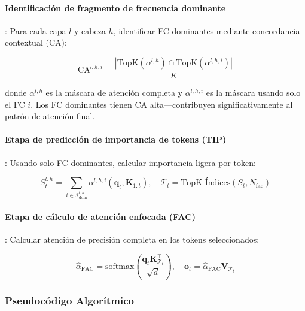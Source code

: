 \documentclass[11pt,a4paper]{article}
\begin{document}
\paragraph{Identificación de fragmento de frecuencia dominante}: Para cada capa $l$ y cabeza $h$, identificar FC dominantes mediante concordancia contextual (CA):

\[
\text{CA}^{l,h,i} = \frac{|\text{TopK}(\alpha^{l,h}) \cap \text{TopK}(\alpha^{l,h,i})|}{K}
\]

donde $\alpha^{l,h}$ es la máscara de atención completa y $\alpha^{l,h,i}$ es la máscara usando solo el FC $i$. Los FC dominantes tienen CA alta---contribuyen significativamente al patrón de atención final.

\paragraph{Etapa de predicción de importancia de tokens (TIP)}: Usando solo FC dominantes, calcular importancia ligera por token:

\[
S_t^{l,h} = \sum_{i \in \mathcal{I}_{\text{dom}}^{l,h}} \alpha^{l,h,i}(\mathbf{q}_t, \mathbf{K}_{1:t}), \quad \mathcal{T}_t = \text{TopK-Índices}(S_t, N_{\text{fac}})
\]

\paragraph{Etapa de cálculo de atención enfocada (FAC)}: Calcular atención de precisión completa en los tokens seleccionados:

\[
\hat{\alpha}_{\text{FAC}} = \text{softmax}\left(\frac{\mathbf{q}_t \mathbf{K}_{\mathcal{T}_t}^\top}{\sqrt{d}}\right), \quad \mathbf{o}_t = \hat{\alpha}_{\text{FAC}} \mathbf{V}_{\mathcal{T}_t}
\]

\subsubsection{Pseudocódigo Algorítmico}
\end{document}
